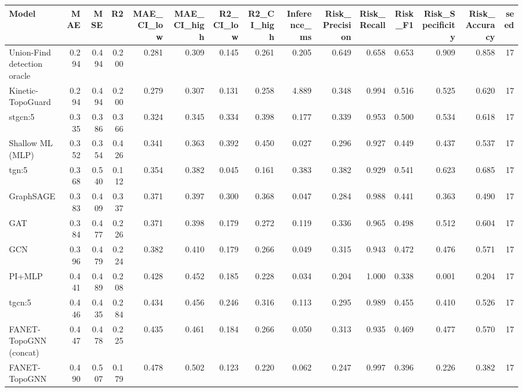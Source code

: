 \begin{tabular}{lrrrrrrrrrrrrrr}
\toprule
Model & MAE & MSE & R2 & MAE\_CI\_low & MAE\_CI\_high & R2\_CI\_low & R2\_CI\_high & Inference\_ms & Risk\_Precision & Risk\_Recall & Risk\_F1 & Risk\_Specificity & Risk\_Accuracy & seed \\
\midrule
Union-Find detection oracle & 0.294 & 0.494 & 0.200 & 0.281 & 0.309 & 0.145 & 0.261 & 0.205 & 0.649 & 0.658 & 0.653 & 0.909 & 0.858 & 17 \\
Kinetic-TopoGuard & 0.294 & 0.494 & 0.200 & 0.279 & 0.307 & 0.131 & 0.258 & 4.889 & 0.348 & 0.994 & 0.516 & 0.525 & 0.620 & 17 \\
stgcn:5 & 0.335 & 0.386 & 0.366 & 0.324 & 0.345 & 0.334 & 0.398 & 0.177 & 0.339 & 0.953 & 0.500 & 0.534 & 0.618 & 17 \\
Shallow ML (MLP) & 0.352 & 0.354 & 0.426 & 0.341 & 0.363 & 0.392 & 0.450 & 0.027 & 0.296 & 0.927 & 0.449 & 0.437 & 0.537 & 17 \\
tgn:5 & 0.368 & 0.540 & 0.112 & 0.354 & 0.382 & 0.045 & 0.161 & 0.383 & 0.382 & 0.929 & 0.541 & 0.623 & 0.685 & 17 \\
GraphSAGE & 0.383 & 0.409 & 0.337 & 0.371 & 0.397 & 0.300 & 0.368 & 0.047 & 0.284 & 0.988 & 0.441 & 0.363 & 0.490 & 17 \\
GAT & 0.384 & 0.477 & 0.226 & 0.371 & 0.398 & 0.179 & 0.272 & 0.119 & 0.336 & 0.965 & 0.498 & 0.512 & 0.604 & 17 \\
GCN & 0.396 & 0.479 & 0.224 & 0.382 & 0.410 & 0.179 & 0.266 & 0.049 & 0.315 & 0.943 & 0.472 & 0.476 & 0.571 & 17 \\
PI+MLP & 0.441 & 0.489 & 0.208 & 0.428 & 0.452 & 0.185 & 0.228 & 0.034 & 0.204 & 1.000 & 0.338 & 0.001 & 0.204 & 17 \\
tgcn:5 & 0.446 & 0.435 & 0.284 & 0.434 & 0.456 & 0.246 & 0.316 & 0.113 & 0.295 & 0.989 & 0.455 & 0.410 & 0.526 & 17 \\
FANET-TopoGNN (concat) & 0.447 & 0.478 & 0.225 & 0.435 & 0.461 & 0.184 & 0.266 & 0.050 & 0.313 & 0.935 & 0.469 & 0.477 & 0.570 & 17 \\
FANET-TopoGNN & 0.490 & 0.507 & 0.179 & 0.478 & 0.502 & 0.123 & 0.220 & 0.062 & 0.247 & 0.997 & 0.396 & 0.226 & 0.382 & 17 \\
\bottomrule
\end{tabular}